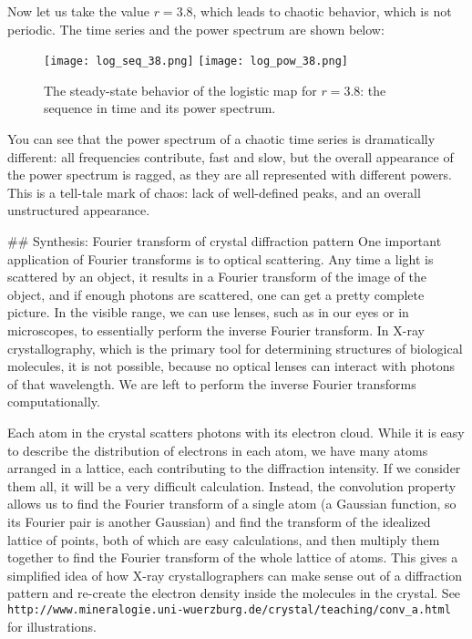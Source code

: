 Now let us take the value $r=3.8$, which leads to chaotic behavior, which is not periodic. The time series and the power spectrum are shown below:
\begin{figure}[htbp] %
   \centering
   \texttt{[image: log\_seq\_38.png]}
   \texttt{[image: log\_pow\_38.png]}  
   \caption{The steady-state behavior of the logistic map for $r=3.8$: the sequence in time and its power spectrum.}
\end{figure}
You can see that the power spectrum of a chaotic time series is dramatically different: all frequencies contribute, fast and slow, but the overall appearance of the power spectrum is ragged, as they are all represented with different powers. This is a tell-tale mark of chaos: lack of well-defined peaks, and an overall unstructured appearance.



## Synthesis: Fourier transform of crystal diffraction pattern
One important application of Fourier transforms is to optical scattering. Any time a light is scattered by an object, it results in a Fourier transform of the image of the object, and if enough photons are scattered, one can get a pretty complete picture. In the visible range, we can use lenses, such as in our eyes or in microscopes, to essentially perform the inverse Fourier transform. In X-ray crystallography, which is the primary tool for determining structures of biological molecules, it is not possible, because no optical lenses can interact with photons of that wavelength. We are left to perform the inverse Fourier transforms computationally.

Each atom in the crystal scatters photons with its electron cloud. While it is easy to describe the distribution of electrons in each atom, we have many atoms arranged in a lattice, each contributing to the diffraction intensity. If we consider them all, it will be a very difficult calculation. Instead, the convolution property allows us to find the Fourier transform of a single atom (a Gaussian function, so its Fourier pair is another Gaussian) and find the transform of the idealized lattice of points, both of which are easy calculations, and then multiply them together to find the Fourier transform of the whole lattice of atoms. This gives a simplified idea of how X-ray crystallographers can make sense out of a  diffraction pattern and re-create the electron density inside the molecules in the crystal. See {\tt http://www.mineralogie.uni-wuerzburg.de/crystal/teaching/conv\_a.html} for illustrations. 
